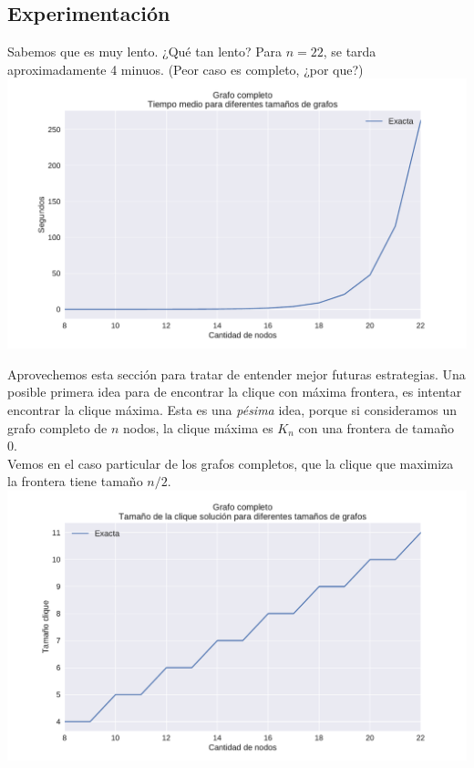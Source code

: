 \subsection{Experimentación}


Sabemos que es muy lento. ¿Qué tan lento? Para $n = 22$, se tarda aproximadamente 4 minuos. (Peor caso es completo, ¿por que?) \\

{\centering
    \includegraphics[width=1\textwidth]{informe/imgs/exp_completo_tiempo_exacta.pdf} \\
}

Aprovechemos esta sección para tratar de entender mejor futuras estrategias. Una posible primera idea para de encontrar la clique con máxima frontera, es intentar encontrar la clique máxima. Esta es una \textit{pésima} idea, porque si consideramos un grafo completo de $n$ nodos, la clique máxima es $K_n$ con una frontera de tamaño 0. \\

Vemos en el caso particular de los grafos completos, que la clique que maximiza la frontera tiene tamaño $n/2$. \\

{\centering
    \includegraphics[width=1\textwidth]{informe/imgs/exp_completo_clique_exacta.pdf} \\
}


